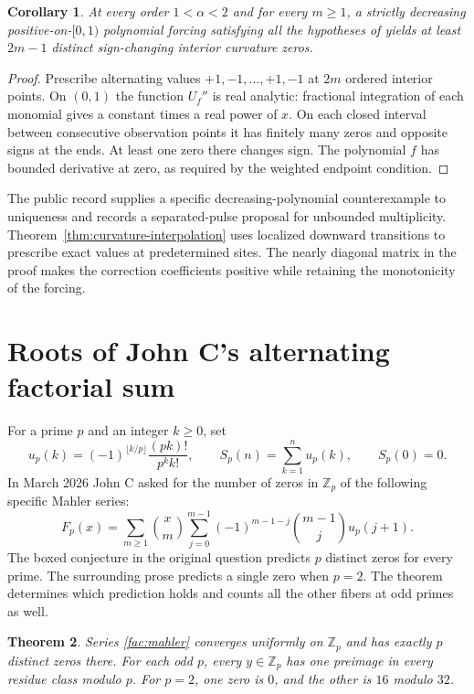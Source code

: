 \documentclass[11pt]{article}
\newtheorem{theorem}{Theorem}[section]
\newtheorem{corollary}[theorem]{Corollary}
\theoremstyle{remark}\newtheorem{remark}[theorem]{Remark}
\begin{document}
\begin{corollary}\label{cor:many-inflections}
At every order $1<\alpha<2$ and for every $m\ge1$, a strictly
decreasing positive-on-$[0,1)$ polynomial forcing satisfying all
the hypotheses of \cite[Thm.~5.2]{LMS} yields at least $2m-1$ distinct
sign-changing interior curvature zeros.
\end{corollary}

\begin{proof}
Prescribe alternating values $+1,-1,\ldots,+1,-1$ at $2m$ ordered
interior points. On $(0,1)$ the function $U_f''$ is real analytic:
fractional integration of each monomial gives a constant times a real
power of $x$. On each closed interval between consecutive observation
points it has finitely many zeros and opposite signs at the ends.
At least one zero there changes sign. The polynomial $f$ has bounded
derivative at zero, as required by the weighted endpoint condition.
\end{proof}

The public record \cite{Omega} supplies a specific decreasing-polynomial
counterexample to uniqueness and records a separated-pulse proposal
for unbounded multiplicity. Theorem~\ref{thm:curvature-interpolation}
uses localized downward transitions to prescribe exact values at
predetermined sites. The nearly diagonal matrix in the proof makes
the correction coefficients positive while retaining the monotonicity
of the forcing.


\section{Roots of John C's alternating factorial sum}\label{fac:section}

For a prime $p$ and an integer $k\ge 0$, set
\[
 u_p(k)=(-1)^{\lfloor k/p\rfloor}\frac{(pk)!}{p^k k!},
 \qquad S_p(n)=\sum_{k=1}^n u_p(k),\qquad S_p(0)=0.
\]
In March 2026 John C \cite{John} asked for the number of zeros in $\mathbb Z_p$ of
the following specific Mahler series:
\begin{equation}\label{fac:mahler}
 F_p(x)=\sum_{m\ge1}\binom{x}{m}
 \sum_{j=0}^{m-1}(-1)^{m-1-j}\binom{m-1}{j}u_p(j+1).
\end{equation}
The boxed conjecture in the original question predicts $p$ distinct
zeros for every prime. The surrounding prose predicts a single zero
when $p=2$. The theorem determines which prediction holds and counts
all the other fibers at odd primes as well.

\begin{theorem}\label{fac:main}
Series \eqref{fac:mahler} converges uniformly on $\mathbb Z_p$ and has
exactly $p$ distinct zeros there. For each odd $p$, every $y\in\mathbb Z_p$
has one preimage in every residue class modulo $p$.
For $p=2$, one zero is $0$, and the other is $16$ modulo $32$.
\end{theorem}
\end{document}
